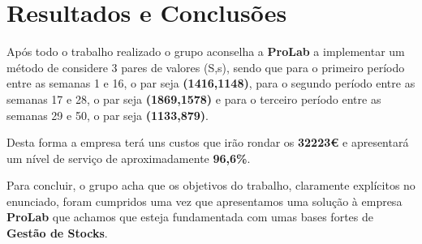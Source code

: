 \documentclass[a4paper]{article}
\begin{document}
\section{Resultados e Conclusões}
\label{sec:conclusao}

Após todo o trabalho realizado o grupo aconselha a \textbf{ProLab} a implementar um método de considere 3 pares de valores (S,s), sendo que para o primeiro período entre as semanas 1 e 16, o par seja \textbf{(1416,1148)}, para o segundo período entre as semanas 17 e 28, o par seja \textbf{(1869,1578)} e para o terceiro período entre as semanas 29 e 50, o par seja \textbf{(1133,879)}.

Desta forma a empresa terá uns custos que irão rondar os \textbf{32223\euro} e apresentará um nível de serviço de aproximadamente \textbf{96,6\%}.

Para concluir, o grupo acha que os objetivos do trabalho, claramente explícitos no enunciado, foram cumpridos uma vez que apresentamos uma solução à empresa \textbf{ProLab} que achamos que esteja fundamentada com umas bases fortes de \textbf{Gestão de Stocks}.
\end{document}

